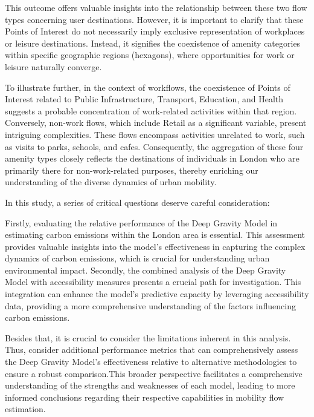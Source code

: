         This outcome offers valuable insights into the relationship between these two flow types concerning user destinations. However, it is important to clarify that these Points of Interest do not necessarily imply exclusive representation of workplaces or leisure destinations. Instead, it signifies the coexistence of amenity categories within specific geographic regions (hexagons), where opportunities for work or leisure naturally converge.

        To illustrate further, in the context of workflows, the coexistence of Points of Interest related to Public Infrastructure, Transport, Education, and Health suggests a probable concentration of work-related activities within that region. Conversely, non-work flows, which include Retail as a significant variable, present intriguing complexities. These flows encompass activities unrelated to work, such as visits to parks, schools, and cafes. Consequently, the aggregation of these four amenity types closely reflects the destinations of individuals in London who are primarily there for non-work-related purposes, thereby enriching our understanding of the diverse dynamics of urban mobility.

        In this study, a series of critical questions deserve careful consideration:
        
        Firstly, evaluating the relative performance of the Deep Gravity Model in estimating carbon emissions within the London area is essential. This assessment provides valuable insights into the model's effectiveness in capturing the complex dynamics of carbon emissions, which is crucial for understanding urban environmental impact. Secondly, the combined analysis of the Deep Gravity Model with accessibility measures presents a crucial path for investigation. This integration can enhance the model's predictive capacity by leveraging accessibility data, providing a more comprehensive understanding of the factors influencing carbon emissions.
        
        Besides that, it is crucial to consider the limitations inherent in this analysis. Thus,  consider additional performance metrics that can comprehensively assess the Deep Gravity Model's effectiveness relative to alternative methodologies to ensure a robust comparison.This broader perspective facilitates a comprehensive understanding of the strengths and weaknesses of each model, leading to more informed conclusions regarding their respective capabilities in mobility flow estimation. 
        
